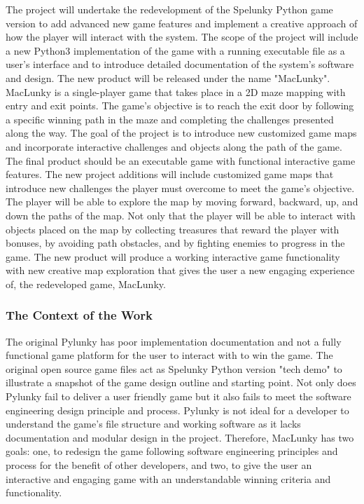 \documentclass[12pt, titlepage]{article}
\begin{document}
The project will undertake the redevelopment of the Spelunky Python game version to add advanced new game features and implement a creative approach of how the player will interact with the system. The scope of the project will include a new Python3 implementation of the game with a running executable file as a user's interface and to introduce detailed documentation of the system's software and design. The new product will be released under the name "MacLunky". MacLunky is a single-player game that takes place in a 2D maze mapping with entry and exit points. The game's objective is to reach the exit door by following a specific winning path in the maze and completing the challenges presented along the way. The goal of the project is to introduce new customized game maps and incorporate interactive challenges and objects along the path of the game. The final product should be an executable game with functional interactive game features. The new project additions will include customized game maps that introduce new challenges the player must overcome to meet the game's objective. The player will be able to explore the map by moving forward, backward, up, and down the paths of the map. Not only that the player will be able to interact with objects placed on the map by collecting treasures that reward the player with bonuses, by avoiding path obstacles, and by fighting enemies to progress in the game. The new product will produce a working interactive game functionality with new creative map exploration that gives the user a new engaging experience of, the redeveloped game, MacLunky. 

\subsubsection{The Context of the Work} 

The original Pylunky has poor implementation documentation and not a fully functional game platform for the user to interact with to win the game. The original open source game files act as Spelunky Python version "tech demo" to illustrate a snapshot of the game design outline and starting point. Not only does Pylunky fail to deliver a user friendly game but it also fails to meet the software engineering design principle and process. Pylunky is not ideal for a developer to understand the game's file structure and working software as it lacks documentation and modular design in the project. Therefore, MacLunky has two goals: one, to redesign the game following software engineering principles and process for the benefit of other developers, and two, to give the user an interactive and engaging game with an understandable winning criteria and functionality.  
\end{document}

